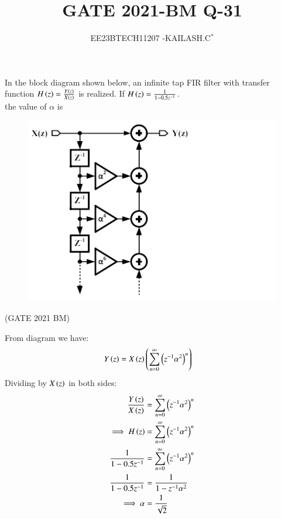 \documentclass[journal,12pt,twocolumn]{IEEEtran}
\theoremstyle{remark}
\begin{document}

\vspace{3cm}

\title{GATE 2021-BM Q-31}
\author{EE23BTECH11207 -KAILASH.C$^{*}$%
}
\maketitle
\newpage
\bigskip

\renewcommand{\thefigure}{\theenumi}
\renewcommand{\thetable}{\theenumi}
In the block diagram shown below, an infinite tap FIR filter with transfer function $H\left(z\right)=\frac{Y\left(z\right)}{X\left(z\right)}$ is realized. If $H\left(z\right)=\frac{1}{1-0.5z^{-1}}$.\\the value of $\alpha$ is
\begin{figure}[h]
    \includegraphics[width=1\columnwidth]{2021/BM/31/figs/questionfig.png}
    \label{fig:question31bm}
\end{figure} \hfill(GATE 2021 BM)
\solution
\fi

From diagram we have:
\begin{align}
    Y\left(z\right)&=X\left(z\right)\left(\sum_{n=0}^{\infty}\left(z^{-1}\alpha^{2}\right)^n\right)\label{eq:311_bm}
\end{align}
Dividing by $X\left(z\right)$ in both sides:
\begin{align}
    \frac{Y\left(z\right)}{X\left(z\right)}&=\sum_{n=0}^{\infty}\left(z^{-1}\alpha^{2}\right)^n\label{eq:312_bm}\\
    \implies H\left(z\right)&=\sum_{n=0}^{\infty}\left(z^{-1}\alpha^{2}\right)^n\label{eq:313_bm}\\
    \frac{1}{1-0.5z^{-1}}&=\sum_{n=0}^{\infty}\left(z^{-1}\alpha^{2}\right)^n\label{eq:314_bm}\\
\frac{1}{1-0.5z^{-1}}&=\frac{1}{1-z^{-1}\alpha^{2}}\label{eq:315_bm}\\
\implies \alpha&=\frac{1}{\sqrt{2}}\label{eq:316_bm}
\end{align}
\end{document}
